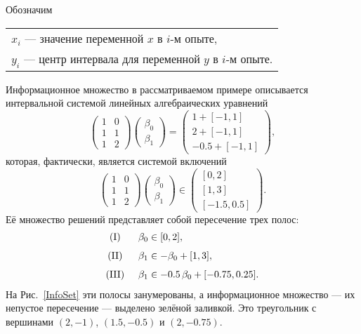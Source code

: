 \documentclass[a5paper,openany]{book}
\newcounter{IreneExmp}
\begin{document}
Обозначим \begin{tabular}[t]{l}
          $x_i$ --- значение переменной $x$ в $i$-м опыте,\\
          $y_i$ --- центр интервала для переменной $y$ в $i$-м опыте.
          \end{tabular}
  
\smallskip\noindent 
Информационное множество в рассматриваемом примере описывается интервальной системой 
линейных алгебраических уравнений 
\begin{equation}
\label{IreneExmpSys}
\begin{pmatrix} 1 & 0 \\[3pt] 1 & 1\\[3pt] 1 & 2 \end{pmatrix} 
\begin{pmatrix} \beta_{0}\\[3pt] \beta_{1} \end{pmatrix}
= 
\begin{pmatrix} 1+[-1,1]\\[3pt] 2+[-1,1]\\[3pt] -0.5+[-1,1] \end{pmatrix}, 
\end{equation}
которая, фактически, является системой включений 
\begin{equation*}
\begin{pmatrix} 1 & 0 \\[3pt] 1 & 1\\[3pt] 1 & 2 \end{pmatrix} 
\begin{pmatrix} \beta_{0}\\[3pt] \beta_{1} \end{pmatrix}
\in
\begin{pmatrix} [0, 2]\\[3pt] [1,3]\\[3pt] [-1.5,0.5] \end{pmatrix}. 
\end{equation*} 
Её множество решений представляет собой пересечение трех полос: 
\begin{equation*} 
\begin{array}{c@{\hspace{5mm}}l} 
(\rm{I})& \beta_{0}\in [0,2],\\[7pt] 
(\rm{II})& \beta_{1}\in -\beta_{0} + [1,3],\\[7pt] 
(\rm{III})& \beta_{1}\in -0.5\,\beta_{0} + [-0.75,0.25]. 
\end{array}
\end{equation*}
На Рис.~\ref{InfoSet} эти полосы занумерованы, а информационное множество --- их 
непустое пересечение --- выделено зелёной заливкой. Это треугольник с вершинами 
$(2, -1)$, $(1.5, -0.5)$ и $(2, -0.75)$. 
  
\end{document}
